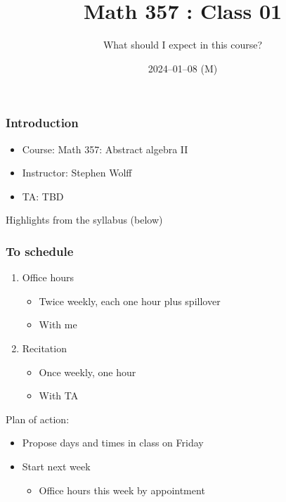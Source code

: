 \documentclass[blue]{beamer}
\begin{document}
\title{Math 357 : Class 01}
\subtitle{What should I expect in this course?}
\date{2024--01--08 (M)}



\begin{frame}
\titlepage
\end{frame}



\begin{frame}
\frametitle{Introduction}

\begin{itemize}
    \item Course: Math 357: Abstract algebra II
    \item Instructor: Stephen Wolff
    \item TA: TBD
\end{itemize}

\vspace{0.5in}

Highlights from the syllabus (below)
\end{frame}



\begin{frame}
\frametitle{To schedule}

\begin{enumerate}
    \item Office hours
    \begin{itemize}
        \item Twice weekly, each one hour plus spillover
        \item With me
    \end{itemize}
\item Recitation
    \begin{itemize}
        \item Once weekly, one hour
        \item With TA
    \end{itemize}
\end{enumerate}

Plan of action:
\begin{itemize}
    \item Propose days and times in class on Friday
    \item Start next week
    \begin{itemize}
        \item Office hours this week by appointment
    \end{itemize}
\end{itemize}
\end{frame}
\end{document}
